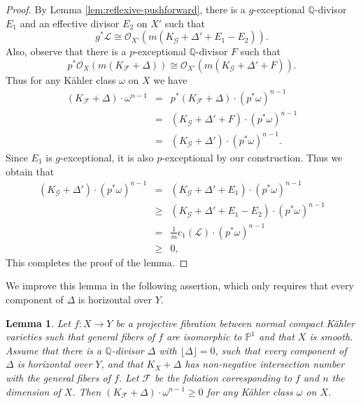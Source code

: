\documentclass[12pt]{amsart}
\newcommand{\mbQ}{\mathbb{Q}}
\newcommand{\<}{\leq}
\def\>{\geq}
\newcommand{\D}{\Delta}
\def\mcO{\mathcal{O}}
\def\mcF{\mathcal{F}}
\def\mcG{\mathcal{G}}
\def\mcL{\mathcal{L}}
\def\msL{\mathscr{L}}
\newtheorem{lemma}[theorem]{Lemma}
\theoremstyle{remark}
\theoremstyle{definition}
\theoremstyle{definition}
\numberwithin{equation}{section}
\theoremstyle{definition}
\theoremstyle{definition}
\begin{document}
\begin{proof}
By Lemma \ref{lem:reflexive-pushforward}, there is a $g$-exceptional $\mbQ$-divisor  $E_1$ and an effective divisor $E_2$ on $X'$ such that 
\[
g^*\msL\cong \mathcal{O}_{X'}(m(K_{\mcG}+ \D'+E_1-E_2)).
\] 
Also, observe that there is a $p$-exceptional $\mbQ$-divisor $F$ such that  
\[p^*\mcO_X(m(K_{\mcF}+\Delta))\cong\mcO_{X'}(m(K_{\mcG}+\Delta'+F)).\]
Thus for any K\"ahler class $\omega$ on $X$ we have 
\begin{eqnarray*}
(K_{\mcF}+\D)\cdot \omega^{n-1} &=&  p^*(K_{\mcF}+\D)\cdot (p^*\omega )^ {n-1} \\
&=&(K_{\mcG}+\D'+F) \cdot (p^*\omega)^{n-1}\\
&=& (K_{\mcG}+\D') \cdot (p^*\omega)^{n-1}.
\end{eqnarray*}
Since $E_1$ is $g$-exceptional, it is also $p$-exceptional by our construction. 
Thus we obtain that
\begin{eqnarray*}
    (K_{\mcG}+\Delta')\cdot (p^*\omega)^{n-1} &=& (K_{\mcG}+\Delta'+E_1) \cdot (p^*\omega)^{n-1}  \\ 
     &\>& (K_{\mcG}+\Delta'+E_1-E_2)\cdot (p^*\omega)^{n-1}\\
     &= &  \frac{1}{m} c_1(\mcL) \cdot (p^*\omega)^{n-1}\\ &\>&0,
\end{eqnarray*}
This completes the proof of the lemma.        
\end{proof}

    

 


 

We improve this lemma in the following assertion, 
which only requires that every component of $\D$ is horizontal over $Y$. 

\begin{lemma}
\label{lem-effective-adjoint-foliation-canonical-regular}
Let $f\colon X \to Y$ be a projective fibration between normal  compact K\"ahler varieties such that general fibers of $f$ are isomorphic to $\mathbb{P}^1$ and that  $X$ is smooth. 
Assume that there is a  $\mbQ$-divisor $\D$ with $\lfloor \D \rfloor =0$,  
such  that   every component of  $\D$ is horizontal over $Y$,
and that  $K_X+\D$  has non-negative  intersection number  with the general fibers of $f$. 
Let $\mcF$ be the foliation corresponding to $f$ and $n$   the dimension of $X$.  
Then   $(K_{\mcF}+\D) \cdot \omega^{n-1} \> 0$ for any K\"ahler class $\omega$ on $X$.  
\end{lemma} 
\end{document}
